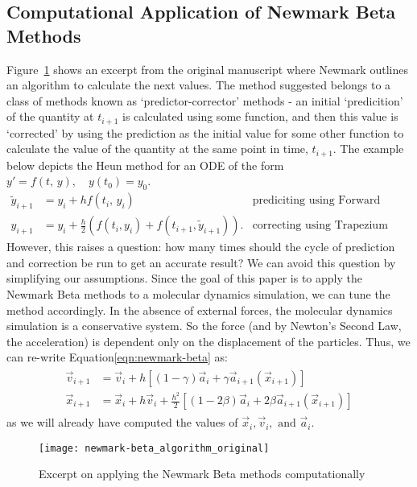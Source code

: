 \documentclass[../Main.tex]{subfiles}
\begin{document}
\subsection{Computational Application of Newmark Beta Methods} \label{subsection:numerical_newmark-beta}
Figure~\ref{fig:newmark-beta_algorithm_original} shows an excerpt from the original manuscript \cite{Newmark1959} where Newmark outlines an algorithm to calculate the next values. The method suggested belongs to a class of methods known as `predictor-corrector' methods - an initial `predicition' of the quantity at $t_{i+1}$ is calculated using some function, and then this value is `corrected' by using the prediction as the initial value for some other function to calculate the value of the quantity at the same point in time, $t_{i+1}$. The example below depicts the Heun method for an ODE of the form $y' = f\left(t\mbox{, }y\right), \quad y\left(t_{0}\right) = y_{0}$.
\begin{align*}
	\tilde{y}_{i+1} & = y_{i} + hf\left(t_{i}\mbox{, }y_{i}\right) & \mbox{prediciting using Forward Euler Method} \\
	y_{i+1} & = y_{i} + \frac{h}{2}\left(f\left(t_{i}, y_{i}\right) + f\left(t_{i+1}, \tilde{y}_{i+1}\right)\right). & \mbox{correcting using Trapezium Rule}
\end{align*}
However, this raises a question: how many times should the cycle of prediction and correction be run to get an accurate result? We can avoid this question by simplifying our assumptions. Since the goal of this paper is to apply the Newmark Beta methods to a molecular dynamics simulation, we can tune the method accordingly. In the absence of external forces, the molecular dynamics simulation is a conservative system. So the force (and by Newton's Second Law, the acceleration) is dependent only on the displacement of the particles. Thus, we can re-write Equation\ref{eqn:newmark-beta} as:
\begin{align*}
	\begin{split}
		\vec{v}_{i+1} & = \vec{v}_{i} + h\left[\left(1-\gamma\right)\vec{a}_{i} + \gamma\vec{a}_{i+1}\left(\vec{x}_{i+1}\right)\right] \\
		\vec{x}_{i+1} & = \vec{x}_{i} + h\vec{v}_{i} + \frac{h^2}{2}\left[\left(1-2\beta \right)\vec{a}_{i} + 2\beta\vec{a}_{i+1}\left(\vec{x}_{i+1}\right)\right] 
	\end{split}
\end{align*}
as we will already have computed the values of $\vec{x}_{i}, \vec{v}_{i},\mbox{ and }\vec{a}_{i}$.
\begin{figure}[h]
\texttt{[image: newmark-beta\_algorithm\_original]}
\centering
\caption{Excerpt on applying the Newmark Beta methods computationally}
\label{fig:newmark-beta_algorithm_original}
\end{figure}
\end{document}
